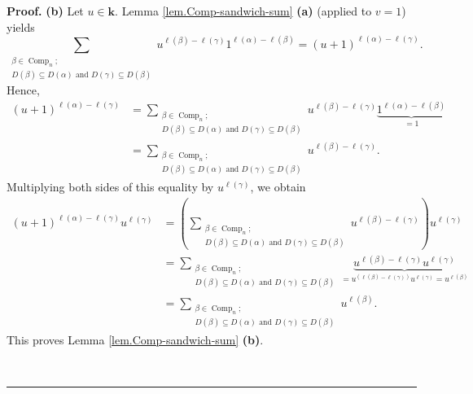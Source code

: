 \documentclass[numbers=enddot,12pt,final,onecolumn,notitlepage]{scrartcl}%
\theoremstyle{definition}
\newenvironment{proof}[1][Proof]{\noindent\textbf{#1.} }{\ \rule{0.5em}{0.5em}}
\let\sumnonlimits\sum
\renewcommand{\sum}{\sumnonlimits\limits}
\newenvironment{verlong}{}{}
\begin{document}
\begin{verlong}
\begin{proof}
\textbf{(b)} Let $u\in\mathbf{k}$. Lemma \ref{lem.Comp-sandwich-sum}
\textbf{(a)} (applied to $v=1$) yields
\[
\sum_{\substack{\beta\in\operatorname*{Comp}\nolimits_{n};\\D\left(
\beta\right)  \subseteq D\left(  \alpha\right)  \text{ and }D\left(
\gamma\right)  \subseteq D\left(  \beta\right)  }}u^{\ell\left(  \beta\right)
-\ell\left(  \gamma\right)  }1^{\ell\left(  \alpha\right)  -\ell\left(
\beta\right)  }=\left(  u+1\right)  ^{\ell\left(  \alpha\right)  -\ell\left(
\gamma\right)  }.
\]
Hence,%
\begin{align*}
\left(  u+1\right)  ^{\ell\left(  \alpha\right)  -\ell\left(  \gamma\right)
}  &  =\sum_{\substack{\beta\in\operatorname*{Comp}\nolimits_{n};\\D\left(
\beta\right)  \subseteq D\left(  \alpha\right)  \text{ and }D\left(
\gamma\right)  \subseteq D\left(  \beta\right)  }}u^{\ell\left(  \beta\right)
-\ell\left(  \gamma\right)  }\underbrace{1^{\ell\left(  \alpha\right)
-\ell\left(  \beta\right)  }}_{=1}\\
&  =\sum_{\substack{\beta\in\operatorname*{Comp}\nolimits_{n};\\D\left(
\beta\right)  \subseteq D\left(  \alpha\right)  \text{ and }D\left(
\gamma\right)  \subseteq D\left(  \beta\right)  }}u^{\ell\left(  \beta\right)
-\ell\left(  \gamma\right)  }.
\end{align*}
Multiplying both sides of this equality by $u^{\ell\left(  \gamma\right)  }$,
we obtain%
\begin{align*}
\left(  u+1\right)  ^{\ell\left(  \alpha\right)  -\ell\left(  \gamma\right)
}u^{\ell\left(  \gamma\right)  }  &  =\left(  \sum_{\substack{\beta
\in\operatorname*{Comp}\nolimits_{n};\\D\left(  \beta\right)  \subseteq
D\left(  \alpha\right)  \text{ and }D\left(  \gamma\right)  \subseteq D\left(
\beta\right)  }}u^{\ell\left(  \beta\right)  -\ell\left(  \gamma\right)
}\right)  u^{\ell\left(  \gamma\right)  }\\
&  =\sum_{\substack{\beta\in\operatorname*{Comp}\nolimits_{n};\\D\left(
\beta\right)  \subseteq D\left(  \alpha\right)  \text{ and }D\left(
\gamma\right)  \subseteq D\left(  \beta\right)  }}\underbrace{u^{\ell\left(
\beta\right)  -\ell\left(  \gamma\right)  }u^{\ell\left(  \gamma\right)  }%
}_{=u^{\left(  \ell\left(  \beta\right)  -\ell\left(  \gamma\right)  \right)
}u^{\ell\left(  \gamma\right)  }=u^{\ell\left(  \beta\right)  }}\\
&  =\sum_{\substack{\beta\in\operatorname*{Comp}\nolimits_{n};\\D\left(
\beta\right)  \subseteq D\left(  \alpha\right)  \text{ and }D\left(
\gamma\right)  \subseteq D\left(  \beta\right)  }}u^{\ell\left(  \beta\right)
}.
\end{align*}
This proves Lemma \ref{lem.Comp-sandwich-sum} \textbf{(b)}.


\end{proof}
\end{verlong}
\end{document}

